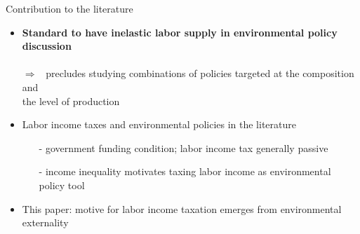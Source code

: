 \documentclass[11pt,aspectratio=169]{beamer}
\newcommand{\ar}{$\Rightarrow$ \ }
\begin{document}
\begin{frame}{Contribution to the literature}
	\begin{itemize}[<+->]
		\item \alert{\textbf{Standard to have inelastic labor supply in environmental policy discussion}}\\  \footnotesize{ \citep{Acemoglu2012TheChange, Golosov2014OptimalEquilibrium, Acemoglu2016TransitionTechnology, Fried2018ClimateAnalysis, Hart2019TheEconomists}}
		\\  \normalsize{\alert{\ar precludes studying combinations of policies targeted at the composition and\\ \hspace{5mm} the level of production }}
		\vspace{2mm}
		\item {Labor income taxes and environmental policies in the literature}
		\begin{itemize}
			\item[-]  government funding condition; labor income tax generally passive \\
			\footnotesize{ \citep{ LansBovenberg1994EnvironmentalTaxation, Goulder1995EnvironmentalGuide, Barrage2019OptimalPolicy}} %
			\item[-] {income inequality} motivates taxing labor income as environmental policy tool \\ \footnotesize{\citep{Jacobs2019RedistributionCurves, Dobkowitz2022, Douenne2022OptimalHouseholds}}
		\end{itemize}		
		\vspace{2mm}
		\item \alert{This paper}: motive for labor income taxation emerges from  environmental externality %

\end{itemize}
\end{frame}
\end{document}
